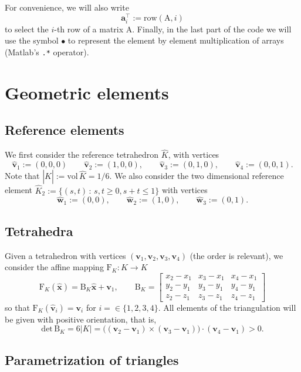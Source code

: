\documentclass[10pt,english]{article}
\begin{document}
For convenience, we will also write
\[
\mathbf a_i^\top:=\mathrm{row}(\mathrm A,i)
\]
to select the $i$-th row of a matrix $\mathrm A$. Finally, in the last part of the code we will use the symbol $\bullet$ to represent the element by element multiplication of arrays (Matlab's {\tt .*} operator).

\section{Geometric elements}


\subsection{Reference elements}
We first consider the reference tetrahedron $\widehat K$, with vertices 
\[
\widehat{\mathbf v}_1:=(0,0,0) \qquad \widehat{\mathbf v}_2:=(1,0,0), \qquad \widehat{\mathbf v}_3:=(0,1,0), \qquad \widehat{\mathbf v}_4:=(0,0,1).
\]
Note that $|\widehat K|:=\mathrm{vol}\,\widehat K=1/6.$ We also consider the two dimensional reference element $\widehat K_2:=\{(s,t)\,:\,s,t\ge 0, s+t\le 1\}$ with vertices
\[
\widehat{\mathbf w}_1:=(0,0), \qquad \widehat{\mathbf w}_2:=(1,0), \qquad \widehat{\mathbf w}_3:=(0,1).
\]

\subsection{Tetrahedra}

Given a tetrahedron with vertices $(\mathbf v_1,\mathbf v_2,\mathbf v_3,\mathbf v_4)$ (the order is relevant), we consider the affine mapping $\mathrm F_K:\widehat K\to K$
\[
\mathrm F_K(\widehat{\mathbf x})=\mathrm B_K \widehat{\mathbf x}+\mathbf v_1, \qquad 
\mathrm B_K=
\left[\begin{array}{ccc}
x_2-x_1 & x_3-x_1 & x_4-x_1\\ 
y_2-y_1 & y_3-y_1 & y_4-y_1\\ 
z_2-z_1 & z_3-z_1 & z_4-z_1
\end{array}\right]
\]
so that $\mathrm F_K(\widehat{\mathbf v}_i)=\mathbf v_i$ for $ i=\in\{1,2,3,4\}$. 
All elements of the triangulation will be given with positive orientation, that is,
\[
\mathrm{det}\,\mathrm B_K=6|K|=\Big( (\mathbf v_2-\mathbf v_1)\times (\mathbf v_3-\mathbf v_1)\Big)\cdot (\mathbf v_4-\mathbf v_1)>0.
\]

\subsection{Parametrization of triangles}
\end{document}

